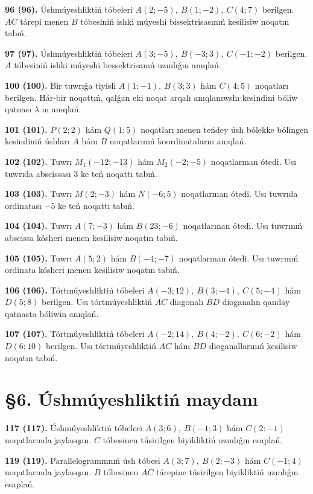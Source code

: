 \documentclass{article}
\begin{document}
\textbf{96 (96).} Úshmúyeshliktiń tóbeleri \(A(2;-5),\ B(1;-2),\ C(4;7)\)
berilgen. $AC$ tárepi menen $B$ tóbesiniń ishki múyeshi
bissektrisasınıń kesilisiw noqatın tabıń.

\textbf{97 (97).} Úshmúyeshliktiń tóbeleri
\(A(3;-5),\ B(-3;3),\ C(-1;-2)\) berilgen. $A$ tóbesiniń ishki
múyeshi bessektrisanıń uzınlıǵın anıqlań.

\textbf{100 (100).} Bir tuwrıǵa tiyisli \(A(1;-1),\ B(3;3)\) hám
\(C(4;5)\) noqatları berilgen. Hár-bir noqattıń, qalǵan eki noqat arqalı anıqlanıwshı kesindini bóliw qatnası $\lambda$ nı anıqlań.

\textbf{101 (101).} \(P(2;2)\) hám \(Q(1;5)\) noqatları menen teńdey úsh
bólekke bólingen kesindiniń úshları $A$ hám $B$ noqatlarınıń
koordinataların anıqlań.

\textbf{102 (102).} Tuwrı \(M_{1}(-12;-13)\) hám \(M_{2}(-2;-5)\)
noqatlarınan ótedi. Usı tuwrıda abscissası 3 ke teń noqattı tabıń.

\textbf{103 (103).} Tuwrı \(M(2;-3)\) hám \(N(-6;5)\) noqatlarınan ótedi.
Usı tuwrıda ordinatası $-5$ ke teń noqattı tabıń.

\textbf{104 (104).} Tuwrı \(A(7;-3)\) hám \(B(23;-6)\) noqatlarınan ótedi.
Usı tuwrınıń abscissa kósheri menen kesilisiw noqatın tabıń.

\textbf{105 (105).} Tuwrı \(A(5;2)\) hám \(B( -4; -7)\) noqatlarınan ótedi.
Usı tuwrınıń ordinata kósheri menen kesilisiw noqatın tabıń.

\textbf{106 (106).} Tórtmúyeshliktiń tóbeleri
\(A(-3;12),\ B(3;-4),\ C(5;-4)\) hám \(D(5;8)\) berilgen. Usı
tórtmúyeshliktiń $AC$ diagonalı $BD$ dioganalın qanday
qatnasta bóliwin anıqlań.

\textbf{107 (107).} Tórtmúyeshliktiń tóbeleri
\(A(-2;14),\ B(4;-2),\ C(6;-2)\) hám \(D(6;10)\) berilgen. Usı
tórtmúyeshliktiń $AC$ hám $BD$ dioganallarınıń kesilisiw
noqatın tabıń.

\section*{\S 6. Úshmúyeshliktiń maydanı}

\textbf{117 (117).} Úshmúyeshliktiń tóbeleri \(A(3;6),\ B(-1;3)\) hám
\(C(2:-1)\) noqatlarında jaylasqan. $C$ tóbesinen túsirilgen biyikliktiń uzınlıǵın esaplań.

\textbf{119 (119).} Parallelogrammnıń úsh tóbesi \(A(3;7),\ B(2;-3)\) hám
\(C(-1;4)\) noqatlarında jaylasqan. $B$ tóbesinen $AC$
tárepine túsirilgen biyikliktiń uzınlıǵın esaplań.
\end{document}
